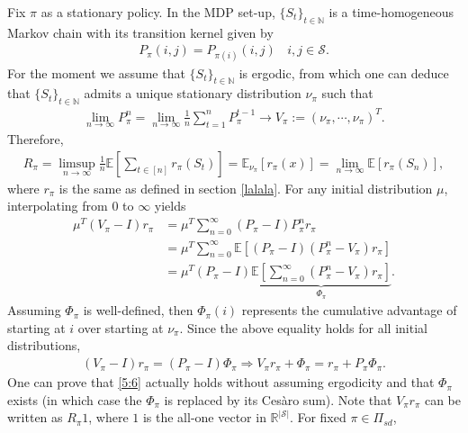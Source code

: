 \documentclass[letterpaper,11pt,openright,openany]{book}
\numberwithin{equation}{section}
\theoremstyle{plain}
\theoremstyle{definition}
\def\R{{\mathbb R}}
\def\N{{\mathbb N}}
\def\E{{\mathbb E}}
\def\R{{\mathbb R}}
\def\S{{\mathcal S}}
\def\A{{\mathcal A}}
\begin{document}
Fix $\pi$ as a stationary policy. 
In the MDP set-up, $\{S_t\}_{t\in\N}$ is a time-homogeneous Markov chain with its transition kernel given by
\begin{align*}
P_\pi(i,j) = P_{\pi(i)}(i, j) \ \ \ \ i,j\in\S.  
\end{align*}
For the moment we assume that $\{S_t\}_{t\in\N}$ is ergodic, from which one can deduce that $\{S_t\}_{t\in\N}$ admits a unique stationary distribution $\nu_\pi$ such that
\begin{align*}
\lim_{n\to\infty}P_\pi^n = \lim_{n\to\infty}\frac{1}{n}\sum_{t=1}^nP^{t-1}_\pi\to V_\pi := (\nu_\pi, \cdots, \nu_\pi)^T.
\end{align*}
Therefore, 
\begin{align*}
R_\pi = \limsup_{n\to\infty}\frac{1}{n}\E\left[\sum_{t\in [n]}r_{\pi}(S_t)\right] = \E_{\nu_\pi}[r_\pi(x)] = \lim_{n\to\infty}\E[r_\pi(S_n)],  
\end{align*} 
where $r_\pi$ is the same as defined in section \ref{lalala}. For any initial distribution $\mu$,  interpolating from $0$ to $\infty$ yields
\begin{align*}
\mu^T(V_\pi-I)r_\pi%
&=\mu^T \sum_{n=0}^\infty(P_\pi - I)P_\pi^nr_\pi \\
&= \mu^T \sum_{n=0}^\infty\E\left[(P_\pi - I)(P_\pi^n-V_\pi)r_\pi\right] \\
&= \mu^T (P_\pi - I)\underbrace{\E\left[\sum_{n=0}^\infty(P_\pi^n-V_\pi)r_\pi\right]}_{\Phi_\pi}.
\end{align*}
Assuming $\Phi_\pi$ is well-defined, then $\Phi_\pi(i)$ represents the cumulative advantage of starting at $i$ over starting at $\nu_\pi$. Since the above equality holds for all initial distributions, 
\begin{align}
(V_\pi-I)r_\pi=(P_\pi - I)\Phi_\pi\Rightarrow V_\pi r_\pi+\Phi_\pi = r_\pi + P_\pi\Phi_\pi. \label{5:6}
\end{align}
One can prove that \eqref{5:6} actually holds without assuming ergodicity and that $\Phi_\pi$ exists (in which case the $\Phi_\pi$ is replaced by its Ces\`aro sum).  
Note that $V_\pi r_\pi$ can be written as $R_\pi 1$, where $1$ is the all-one vector in $\R^{|\S|}$. 
For fixed $\pi\in\Pi_{sd}$, 
\end{document}

